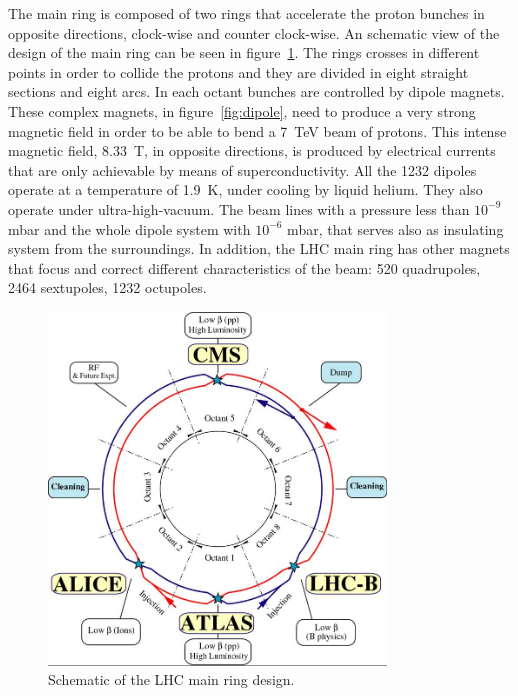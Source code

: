 The main ring is composed of two rings that accelerate the proton bunches in opposite directions, clock-wise and counter clock-wise. An schematic view of the design of the main ring can be seen in figure~\ref{fig:schematic}. The rings crosses in different points in order to collide the protons and they are divided in eight straight sections and eight arcs. In each octant bunches are controlled by dipole magnets. These complex magnets, in figure~\ref{fig:dipole}, need to produce a very strong magnetic field in order to be able to bend a 7~TeV beam of protons. This intense magnetic field, 8.33~T, in opposite directions, is produced by electrical currents that are only achievable by means of superconductivity. All the 1232 dipoles operate at a temperature of 1.9~K, under cooling by liquid helium. They also operate under ultra-high-vacuum. The beam lines with a pressure less than $10^{-9}$ mbar and the whole dipole system with $10^{-6}$ mbar, that serves also as insulating system from the surroundings. In addition, the LHC main ring has other magnets that focus and correct different characteristics of the beam: 520 quadrupoles, 2464 sextupoles, 1232 octupoles. 

\begin{figure}[!Hhtbp]
  \begin{center}
    \includegraphics[width=0.8\textwidth]{figs/lhc-schematic.jpg}
    \caption{Schematic of the LHC main ring design.}
    \label{fig:schematic}
  \end{center}
\end{figure}

